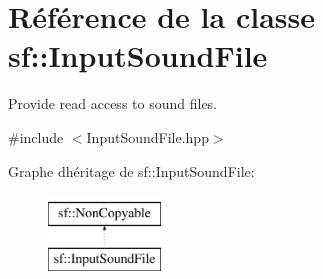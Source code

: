 \hypertarget{classsf_1_1InputSoundFile}{}\section{Référence de la classe sf\+:\+:Input\+Sound\+File}
\label{classsf_1_1InputSoundFile}


Provide read access to sound files.  




{\ttfamily \#include $<$Input\+Sound\+File.\+hpp$>$}

Graphe d\textquotesingle{}héritage de sf\+:\+:Input\+Sound\+File\+:\begin{figure}[H]
\begin{center}
\leavevmode
\includegraphics[height=2.000000cm]{classsf_1_1InputSoundFile}
\end{center}
\end{figure}
